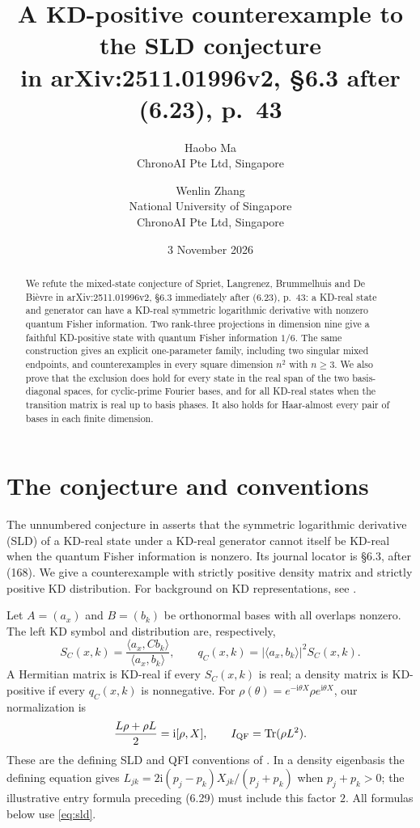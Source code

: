 \documentclass[11pt]{article}
\title{A KD-positive counterexample to the SLD conjecture\\
in arXiv:2511.01996v2, \S6.3 after (6.23), p.~43}
\author{Haobo Ma\\\small ChronoAI Pte Ltd, Singapore
\and Wenlin Zhang\\\small National University of Singapore\\\small ChronoAI Pte Ltd, Singapore}
\date{3 November 2026}
\newcommand{\Tr}{\operatorname{Tr}}
\newcommand{\ii}{\mathrm{i}}
\begin{document}
\maketitle
\begin{abstract}
We refute the mixed-state conjecture of Spriet, Langrenez, Brummelhuis and
De Bi\`evre in arXiv:2511.01996v2, \S6.3 immediately after (6.23), p.~43: a KD-real
state and generator can have a KD-real symmetric logarithmic derivative
with nonzero quantum Fisher information. Two rank-three projections in
dimension nine give a faithful KD-positive state with quantum Fisher
information $1/6$. The same construction gives an explicit one-parameter
family, including two singular mixed endpoints, and counterexamples in
every square dimension $n^2$ with $n\ge3$. We also prove that the exclusion
does hold for every state in the real span of the two basis-diagonal
spaces, for cyclic-prime Fourier bases, and for all KD-real states when
the transition matrix is real up to basis phases. It also holds for
Haar-almost every pair of bases in each finite dimension.
\end{abstract}

\section{The conjecture and conventions}
The unnumbered conjecture in \cite[\S6.3, after (6.23)]{source} asserts that
the symmetric logarithmic derivative (SLD) of a KD-real state under a KD-real
generator cannot itself be KD-real when the quantum Fisher information is
nonzero. Its journal locator is \S6.3, after (168). We give a counterexample
with strictly positive density matrix and strictly positive KD distribution.
For background on KD representations, see \cite[\S II]{survey}.

Let $A=(a_x)$ and $B=(b_k)$ be orthonormal bases with all overlaps nonzero.
The left KD symbol and distribution are, respectively,
\[
 S_C(x,k)=\frac{\langle a_x,Cb_k\rangle}{\langle a_x,b_k\rangle},
 \qquad q_C(x,k)=|\langle a_x,b_k\rangle|^2S_C(x,k).
\]
A Hermitian matrix is KD-real if every $S_C(x,k)$ is real; a density
matrix is KD-positive if every $q_C(x,k)$ is nonnegative.
For $\rho(\theta)=e^{-\ii\theta X}\rho e^{\ii\theta X}$, our normalization is
\begin{equation}\label{eq:sld}
 \frac{L\rho+\rho L}{2}=\ii[\rho,X],\qquad
 I_{\rm QF}=\Tr(\rho L^2).
\end{equation}
These are the defining SLD and QFI conventions of \cite[Appendix E]{source}.
In a density eigenbasis the defining equation gives
$L_{jk}=2\ii(p_j-p_k)X_{jk}/(p_j+p_k)$ when $p_j+p_k>0$;
the illustrative entry formula preceding (6.29) must include this factor $2$.
All formulas below use \eqref{eq:sld}.
\end{document}
